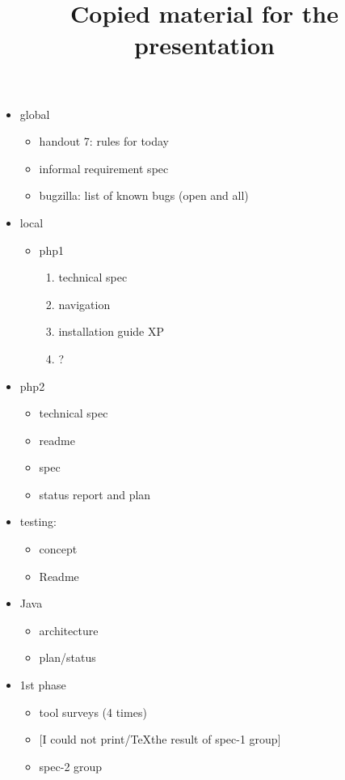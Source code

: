 \documentclass{article}
\title{Copied material for the presentation}
\begin{document}
\maketitle{}

\begin{itemize}
\item global
  \begin{itemize}
  \item handout 7: rules for today
  \item informal requirement spec
  \item bugzilla: list of known bugs (open and all)
  \end{itemize}
\item local
  \begin{itemize}
  \item php1
    \begin{enumerate}
    \item technical spec
    \item navigation
    \item installation guide XP
    \item ?
    \end{enumerate}
  \end{itemize}
\item php2
  \begin{itemize}
  \item technical spec
  \item readme
  \item spec
  \item status report and plan
  \end{itemize}
\item testing:
  \begin{itemize}
  \item concept
  \item Readme
  \end{itemize}
\item Java
  \begin{itemize}
  \item architecture
  \item plan/status
  \end{itemize}
\item 1st phase
  \begin{itemize}
  \item tool surveys (4 times)
  \item {[I could not print/\TeX the result of spec-1 group]}
  \item spec-2 group
  \end{itemize}
\end{itemize}
\end{document}
